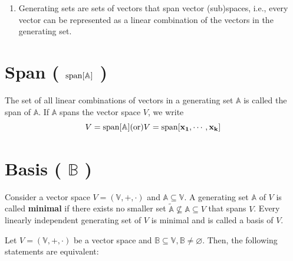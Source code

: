 \begin{enumerate}
    \item Generating sets are sets of vectors that span vector (sub)spaces, i.e., every vector can be represented as a linear combination of the vectors in the generating set.
\end{enumerate}













\section{Span ( $\operatorname{span}[\mathbb{A}]$ ) \cite{mfml-1}} \label{lin-alg: Span}
The set of all linear combinations of vectors in a generating set $\mathbb{A}$ is called the span of $\mathbb{A}$. If $\mathbb{A}$ spans the vector space $V$, we write 
\[
    \hfill
    V = \rcmdXspan[\mathbb{A}]
    \hfill
    \text{(or)}
    \hfill
    V = \rcmdXspan[\mathbf{x_1, \cdots , x_k}]
    \hfill
\]













\section{Basis ( $\mathbb{B}$ ) \cite{mfml-1}}\label{lin-alg: Basis}
Consider a vector space $V = (\mathbb{V}, +, \cdot)$ and $\mathbb{A} \subseteq \mathbb{V}$. A generating set $\mathbb{A}$ of $V$ is called \textbf{minimal} if there exists no smaller set $\tilde{\mathbb{A}} \not\subseteq \mathbb{A} \subseteq V$ that spans $V$. Every linearly independent generating set of $V$ is minimal and is called a basis of $V$.

\vspace{0.2cm}
Let $V = (\mathbb{V}, +, \cdot)$ be a vector space and $\mathbb{B} \subseteq \mathbb{V}, \mathbb{B} \neq \varnothing$. Then, the following statements are equivalent:

